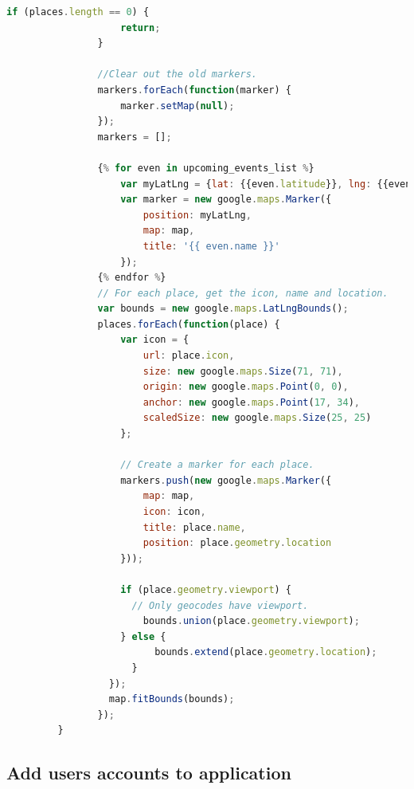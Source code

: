 \documentclass[letterpaper,10pt,onecolumn]{IEEEtran} %
\begin{document}
\begin{enumerate}
\begin{center}
\begin{lstlisting}[language=JavaScript]
                if (places.length == 0) {
                    return;
                }
                
                //Clear out the old markers.
                markers.forEach(function(marker) {
                    marker.setMap(null);
                });
                markers = [];

                {% for even in upcoming_events_list %}
                    var myLatLng = {lat: {{even.latitude}}, lng: {{even.longitude}}};
                    var marker = new google.maps.Marker({
                        position: myLatLng,
                        map: map,
                        title: '{{ even.name }}'
                    });
                {% endfor %}
                // For each place, get the icon, name and location.
                var bounds = new google.maps.LatLngBounds();
                places.forEach(function(place) {
                    var icon = {
                        url: place.icon,
                        size: new google.maps.Size(71, 71),
                        origin: new google.maps.Point(0, 0),
                        anchor: new google.maps.Point(17, 34),
                        scaledSize: new google.maps.Size(25, 25)
                    };

                    // Create a marker for each place.
                    markers.push(new google.maps.Marker({
                        map: map,
                        icon: icon,
                        title: place.name,
                        position: place.geometry.location
                    }));
                    
                    if (place.geometry.viewport) {
                      // Only geocodes have viewport.
                        bounds.union(place.geometry.viewport);
                    } else {
                          bounds.extend(place.geometry.location);
                      }
                  });
                  map.fitBounds(bounds);
                });
         }
      \end{lstlisting}
    \end{center}

\end{enumerate}

\subsection{Add users accounts to application}
\end{document}
